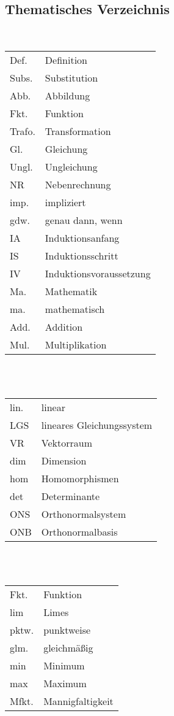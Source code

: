 \subsection{Thematisches Verzeichnis}
\\[2pt]
\begin{tabular}{ll}
Def. & Definition\\
Subs. & Substitution\\
Abb. & Abbildung\\
Fkt. & Funktion\\
Trafo. & Transformation\\
Gl. & Gleichung\\
Ungl. & Ungleichung\\
NR & Nebenrechnung\\
imp. & impliziert\\
gdw. & genau dann, wenn\\
IA & Induktionsanfang\\
IS & Induktionsschritt\\
IV & Induktionsvoraussetzung\\
Ma. & Mathematik\\
ma. & mathematisch\\
Add. & Addition\\
Mul. & Multiplikation
\end{tabular}\\[4pt]
\\[2pt]
\begin{tabular}{ll}
lin. & linear\\
LGS & lineares Gleichungssystem\\
VR & Vektorraum\\
dim & Dimension\\
hom & Homomorphismen\\
det & Determinante\\
ONS & Orthonormalsystem\\
ONB & Orthonormalbasis
\end{tabular}\\[4pt]
\\[2pt]
\begin{tabular}{ll}
Fkt. & Funktion\\
lim & Limes\\
pktw. & punktweise\\
glm. & gleichmäßig\\
min & Minimum\\
max & Maximum\\
Mfkt. & Mannigfaltigkeit
\end{tabular}\\[4pt]
